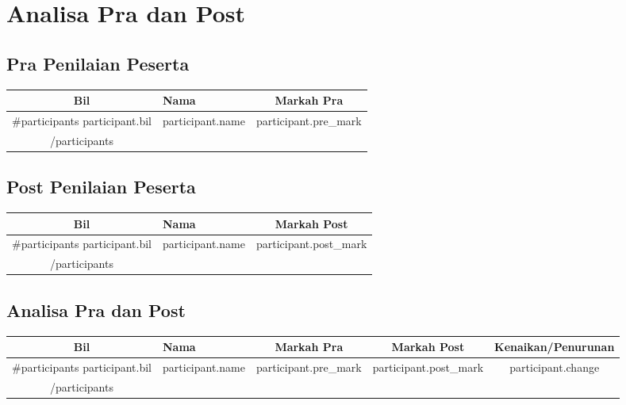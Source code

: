 \documentclass[a4paper,12pt]{article}
\begin{document}

\section{Analisa Pra dan Post}
\subsection{Pra Penilaian Peserta}
\begin{longtable}{|c|p{6cm}|c|}
    \hline
    \rowcolor{lightgray}
    \textbf{Bil} & \textbf{Nama} & \textbf{Markah Pra} \\
    \hline
    \endhead
    {{#participants}}
    {{participant.bil}} & {{participant.name}} & {{participant.pre_mark}} \\
    \hline
    {{/participants}}
\end{longtable}

\subsection{Post Penilaian Peserta}
\begin{longtable}{|c|p{6cm}|c|}
    \hline
    \rowcolor{lightgray}
    \textbf{Bil} & \textbf{Nama} & \textbf{Markah Post} \\
    \hline
    \endhead
    {{#participants}}
    {{participant.bil}} & {{participant.name}} & {{participant.post_mark}} \\
    \hline
    {{/participants}}
\end{longtable}

\subsection{Analisa Pra dan Post}
\begin{longtable}{|c|p{6cm}|c|c|c|}
    \hline
    \rowcolor{lightgray}
    \textbf{Bil} & \textbf{Nama} & \textbf{Markah Pra} & \textbf{Markah Post} & \textbf{Kenaikan/Penurunan} \\
    \hline
    \endhead
    {{#participants}}
    {{participant.bil}} & {{participant.name}} & {{participant.pre_mark}} & {{participant.post_mark}} & {{participant.change}} \\
    \hline
    {{/participants}}
\end{longtable}
\end{document}
